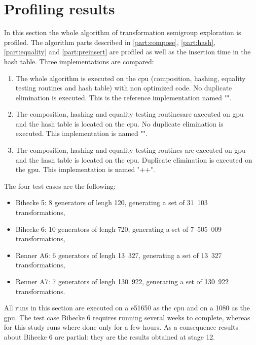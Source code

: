 {\section{Profiling results}
\label{part:results}
In this section the whole algorithm of transformation semigroup exploration is profiled. 
The algorithm parts described in \autoref{part:compose}, \autoref{part:hash}, 
\autoref{part:equality} and \autoref{part:preinsert} are profiled as well as the insertion time in the hash table.
Three implementations are compared:
\begin{enumerate}
\item The whole algorithm is executed on the \gls{cpu} (composition, hashing, equality testing routines and hash table) with non optimized code. 
No duplicate elimination is executed.
This is the reference implementation named "". 
\item The composition, hashing and equality testing routinesare axecuted on \gls{gpu} and the hash table is located on the \gls{cpu}. 
No duplicate elimination is executed.
This implementation is named "".
\item The composition, hashing and equality testing routines are executed on \gls{gpu} and the hash table is located on the \gls{cpu}. 
Duplicate elimination is executed on the \gls{gpu}.
This implementation is named "++".
\end{enumerate}
The four test cases are the following:
\begin{itemize}
\item Bihecke 5: 8 generators of lengh 120, generating a set of 31~103 transformations,
\item Bihecke 6: 10 generators of lengh 720, generating a set of 7~505~009 transformations,
\item Renner A6: 6 generators of lengh 13~327, generating a set of 13~327 transformations,
\item Renner A7: 7 generators of lengh 130~922, generating a set of 130~922 transformations.
\end{itemize}


All runs in this section are executed on a \gls{e51650} as the \gls{cpu} and on a \gls{1080} as the \gls{gpu}.
The test case Bihecke 6 requires running several weeks to complete, whereas for this study runs where done only for a few hours.
As a consequence results about Bihecke 6 are partial: they are the results obtained at stage 12.


}
